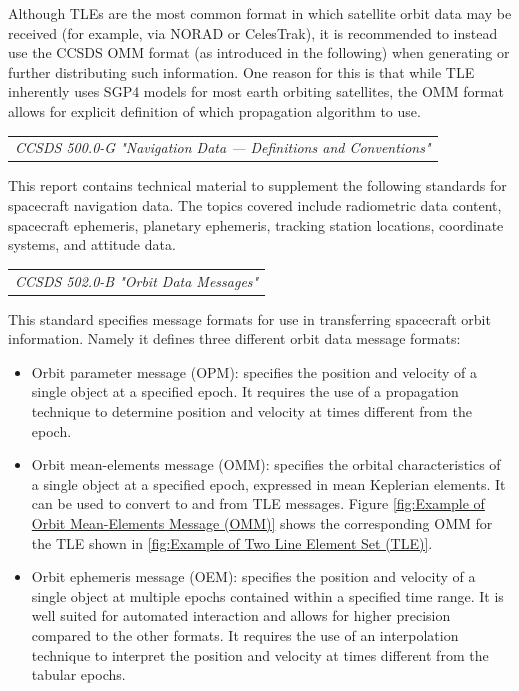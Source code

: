 Although TLEs are the most common format in which satellite orbit data may be received (for example, via NORAD or CelesTrak), it is recommended to instead use the CCSDS OMM format (as introduced in the following) when generating or further distributing such information. One reason for this is that while TLE inherently uses SGP4 models for most earth orbiting satellites, the OMM format allows for explicit definition of which propagation algorithm to use.

\begin{tabular}{l}
\textit{CCSDS 500.0-G "Navigation Data — Definitions and Conventions" \cite{CCSDS 500.0-G}} \\
\end{tabular}

This report contains technical material to supplement the following standards for spacecraft navigation data. The topics covered include radiometric data content, spacecraft ephemeris, planetary ephemeris, tracking station locations, coordinate systems, and attitude data. 

\begin{tabular}{l}
\textit{CCSDS 502.0-B "Orbit Data Messages" \cite{CCSDS 502.0-B}} \\
\end{tabular}

This standard specifies message formats for use in transferring spacecraft orbit information. Namely it defines three different orbit data message formats:

\begin{itemize}
\item Orbit parameter message (OPM): specifies the position and velocity of a single object at a specified epoch. It requires the use of a propagation technique to determine position and velocity at times different from the epoch.
\item Orbit mean-elements message (OMM): specifies the orbital characteristics of a single object at a specified epoch, expressed in mean Keplerian elements. It can be used to convert to and from TLE messages. Figure \ref{fig:Example of Orbit Mean-Elements Message (OMM)} shows the corresponding OMM for the TLE shown in \ref{fig:Example of Two Line Element Set (TLE)}.
\item Orbit ephemeris message (OEM): specifies the position and velocity of a single object at multiple epochs contained within a specified time range. It is well suited for automated interaction and allows for higher precision compared to the other formats. It requires the use of an interpolation technique to interpret the position and velocity at times different from the tabular epochs. 
\end{itemize}


